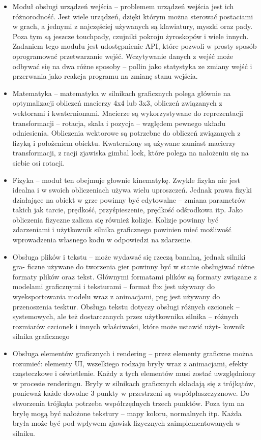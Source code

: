 \documentclass[12pt,twoside]{article}
\begin{document}
\begin{itemize}
\item Moduł obsługi urządzeń wejścia -- problemem urządzeń wejścia jest
ich różnorodność. Jest wiele urządzeń, dzięki którym można sterować postaciami w
grach, a jednymi z najczęściej używanych są klawiatury, myszki oraz pady. Poza
tym są jeszcze touchpady, czujniki pokroju żyroskopów i wiele innych. Zadaniem
tego modułu jest udostępnienie API, które pozwoli w prosty sposób oprogramować
przetwarzanie wejść. Wczytywanie danych z wejść może odbywać się na dwa różne
sposoby -- pollin jako statystyka ze zmiany wejść i przerwania jako
reakcja programu na zmianę stanu wejścia.

\item Matematyka -- matematyka w silnikach graficznych polega głównie
na optymalizacji obliczeń macierzy 4x4 lub 3x3, obliczeń związanych z wektorami
i kwaternionami. Macierze są wykorzystywane do reprezentacji transformacji
-- rotacja, skala i pozycja -- względem pewnego układu
odniesienia. Obliczenia wektorowe są potrzebne do obliczeń związanych z fizyką i
położeniem obiektu. Kwaterniony są używane zamiast macierzy transformacji, z
racji zjawiska gimbal lock, które polega na nałożeniu się na siebie osi rotacji.  

\item Fizyka -- moduł ten obejmuje głownie kinematykę. Zwykle fizyka
nie jest idealna i w swoich obliczeniach używa wielu uproszczeń. Jednak prawa
fizyki działające na obiekt w grze powinny być edytowalne -- zmiana
parametrów takich jak tarcie, prędkość, przyśpieszenie, prędkość odśrodkowa itp.
Jako obliczenia fizyczne zalicza się również kolizje. Kolizje powinny być
zdarzeniami i użytkownik silnika graficznego powinien mieć możliwość
wprowadzenia własnego kodu w odpowiedzi na zdarzenie. \cite{GameDevelpomenPhysics} 

\item Obsługa plików i tekstu – może wydawać się rzeczą banalną, jednak silniki
gra- ficzne używane do tworzenia gier powinny być w stanie obsługiwać różne
formaty plików oraz tekst. Głównymi formatami plików są formaty związane z
modelami graficznymi i teksturami – format fbx jest używany do wyeksportowania
modelu wraz z animacjami, png jest używany do przenoszenia tesktur. Obsługa
tekstu dotyczy obsługi różnych czcionek – systemowych, ale też dostarczanych
przez użytkownika silnika – różnych rozmiarów czcionek i innych właściwości,
które może ustawić użyt- kownik silnika graficznego
 

\item Obsługa elementów graficznych i rendering -- przez elementy graficzne
można rozumieć: elementy UI, wszelkiego rodzaju bryły wraz z animacjami, efekty
cząsteczkowe i oświetlenie. Każdy z tych elementów musi zostać uwzględniony w
procesie renderingu. Bryły w silnikach graficznych składają się z trójkątów,
ponieważ każde dowolne 3 punkty w przestrzeni są współpłaszczyznowe.  Do
stworzenia trójkąta potrzeba współrzędnych trzech punktów. Poza tym na bryłę
mogą być nałożone tekstury – mapy koloru, normalnych itp. Każda bryła może być
pod wpływem zjawisk fizycznych zaimplementowanych w silniku. 


\end{itemize}
\end{document}
